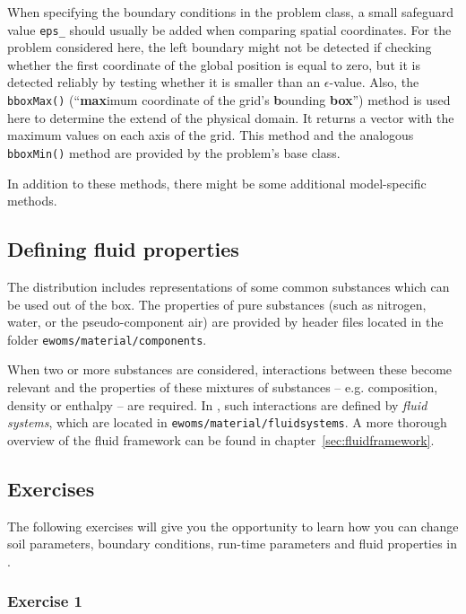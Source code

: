 When specifying the boundary conditions in the problem class, a small
safeguard value \texttt{eps\_} should usually be added when comparing
spatial coordinates. For the problem considered here, the left
boundary might not be detected if checking whether the first
coordinate of the global position is equal to zero, but it is detected
reliably by testing whether it is smaller than an
$\epsilon$-value. Also, the \texttt{bboxMax()} (``\textbf{max}imum
coordinate of the grid's \textbf{b}ounding \textbf{box}'') method is
used here to determine the extend of the physical domain. It returns a
vector with the maximum values on each axis of the grid. This method
and the analogous \texttt{bboxMin()} method are provided by the
problem's base class.

In addition to these methods, there might be some additional
model-specific methods.

\subsection{Defining fluid properties}
\label{tutorial1:description-fluid-class}

The \eWoms distribution includes representations of some common
substances which can be used out of the box. The properties of pure
substances (such as nitrogen, water, or the pseudo-component air) are
provided by header files located in the folder
\texttt{ewoms/material/components}.

When two or more substances are considered, interactions between these
become relevant and the properties of these mixtures of substances --
e.g. composition, density or enthalpy -- are required. In \eWoms, such
interactions are defined by {\em fluid systems}, which are located in
\texttt{ewoms/material/fluidsystems}. A more thorough overview of the
\eWoms fluid framework can be found in
chapter~\ref{sec:fluidframework}.

\subsection{Exercises}
\label{tutorial1:exercises}

The following exercises will give you the opportunity to learn how you
can change soil parameters, boundary conditions, run-time parameters
and fluid properties in \eWoms.

\subsubsection{Exercise 1}

